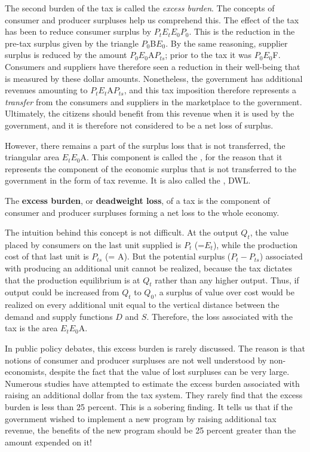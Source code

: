 The second burden of the tax is called the \textit{excess burden}. The concepts of consumer and producer surpluses help us comprehend this. The effect of the tax has been to reduce consumer surplus by $P_tE_tE_0P_0$. This is the reduction in the pre-tax surplus given by the triangle $P_0$B$E_0$. By the same reasoning, supplier surplus is reduced by the amount $P_0E_0$A$P_{ts}$; prior to the tax it was $P_0E_0$F. Consumers and suppliers have therefore seen a reduction in their well-being that is measured by these dollar amounts. Nonetheless, the government has additional revenues amounting to $P_tE_t$A$P_{ts}$, and this tax imposition therefore represents a \textit{transfer} from the consumers and suppliers in the marketplace to the government. Ultimately, the citizens should benefit from this revenue when it is used by the government, and it is therefore not considered to be a net loss of surplus.

However, there remains a part of the surplus loss that is not transferred, the triangular area $E_tE_0$A. This component is called the , for the reason that it represents the component of the economic surplus that is not transferred to the government in the form of tax revenue. It is also called the , DWL.

\begin{DefBox}
The \textbf{excess burden}, or \textbf{deadweight loss}, of a tax is the component of consumer and producer surpluses forming a net loss to the whole economy.
\end{DefBox}

The intuition behind this concept is not difficult. At the output $Q_t$, the value placed by consumers on the last unit supplied is $P_t$ (=$E_t$), while the production cost of that last unit is $P_{ts}$ (= A). But the potential surplus ($P_t-P_{ts}$) associated with producing an additional unit cannot be realized, because the tax dictates that the production equilibrium is at $Q_t$ rather than any higher output. Thus, if output could be increased from $Q_t$ to $Q_0$, a surplus of value over cost would be realized on every additional unit equal to the vertical distance between the demand and supply functions $D$ and $S$. Therefore, the loss associated with the tax is the area $E_tE_0$A.

In public policy debates, this excess burden is rarely discussed. The reason is that notions of consumer and producer surpluses are not well understood by non-economists, despite the fact that the value of lost surpluses can be very large. Numerous studies have attempted to estimate the excess burden associated with raising an additional dollar from the tax system. They rarely find that the excess burden is less than 25 percent. This is a sobering finding. It tells us that if the government wished to implement a new program by raising additional tax revenue, the benefits of the new program should be 25 percent greater than the amount expended on it!

